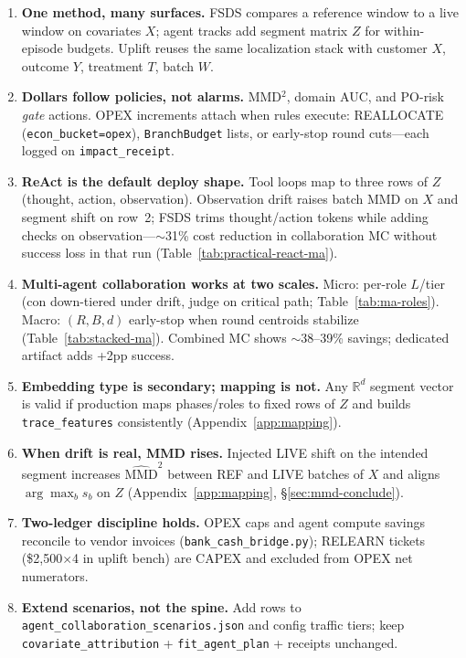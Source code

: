 \documentclass[11pt]{article}
\begin{document}
\begin{enumerate}[label=\textbf{C\arabic*.}]
  \item \textbf{One method, many surfaces.} FSDS compares a reference window to a live window on covariates $X$; agent tracks add segment matrix $Z$ for within-episode budgets. Uplift reuses the same localization stack with customer $X$, outcome $Y$, treatment $T$, batch $W$.
  \item \textbf{Dollars follow policies, not alarms.} MMD$^2$, domain AUC, and PO-risk \emph{gate} actions. OPEX increments attach when rules execute: REALLOCATE (\texttt{econ\_bucket=opex}), \texttt{BranchBudget} lists, or early-stop round cuts---each logged on \texttt{impact\_receipt}.
  \item \textbf{ReAct is the default deploy shape.} Tool loops map to three rows of $Z$ (thought, action, observation). Observation drift raises batch MMD on $X$ and segment shift on row~2; FSDS trims thought/action tokens while adding checks on observation---$\sim$31\% cost reduction in collaboration MC without success loss in that run (Table~\ref{tab:practical-react-ma}).
  \item \textbf{Multi-agent collaboration works at two scales.} Micro: per-role $L$/tier (con down-tiered under drift, judge on critical path; Table~\ref{tab:ma-roles}). Macro: $(R,B,d)$ early-stop when round centroids stabilize (Table~\ref{tab:stacked-ma}). Combined MC shows $\sim$38--39\% savings; dedicated artifact adds +2pp success.
  \item \textbf{Embedding type is secondary; mapping is not.} Any $\mathbb{R}^d$ segment vector is valid if production maps phases/roles to fixed rows of $Z$ and builds \texttt{trace\_features} consistently (Appendix~\ref{app:mapping}).
  \item \textbf{When drift is real, MMD rises.} Injected LIVE shift on the intended segment increases $\widehat{\mathrm{MMD}}^2$ between REF and LIVE batches of $X$ and aligns $\arg\max_b s_b$ on $Z$ (Appendix~\ref{app:mapping}, \S\ref{sec:mmd-conclude}).
  \item \textbf{Two-ledger discipline holds.} OPEX caps and agent compute savings reconcile to vendor invoices (\texttt{bank\_cash\_bridge.py}); RELEARN tickets (\$2{,}500$\times$4 in uplift bench) are CAPEX and excluded from OPEX net numerators.
  \item \textbf{Extend scenarios, not the spine.} Add rows to \texttt{agent\_collaboration\_scenarios.json} and config traffic tiers; keep \texttt{covariate\_attribution} + \texttt{fit\_agent\_plan} + receipts unchanged.
\end{enumerate}
\end{document}
